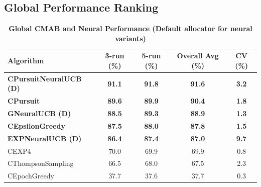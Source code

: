 \documentclass[12pt,a4paper]{article}
\newcommand{\performance}[1]{\textcolor{performancecolor}{\textbf{#1}}}
\newcommand{\legacy}[1]{\textcolor{legacycolor}{\textbf{#1}}}
\newcommand{\neural}[1]{\textcolor{neuralcolor}{\textbf{#1}}}
\begin{document}
\begin{tcolorbox}[colback=performancecolor!10,colframe=performancecolor,title=\textbf{Primary Performance Results (All Aggregations)}]

\subsection{Global Performance Ranking}

\begin{table}[H]
\small
\centering
\caption{\performance{Global CMAB and Neural Performance (Default allocator for neural variants)}}
\label{tab:global-performance}
\begin{tabular}{|l|c|c|c|c|}
\hline
\textbf{Algorithm} & \textbf{3-run (\%)} & \textbf{5-run (\%)} & \textbf{Overall Avg (\%)} & \textbf{CV (\%)} \\
\hline
\hline
\neural{CPursuitNeuralUCB (D)}   & \neural{91.1}     & \neural{91.8}     & \neural{\textbf{91.6}} & \neural{3.2} \\
\performance{CPursuit}           & \performance{89.6} & \performance{89.9} & \performance{\textbf{90.4}} & \performance{1.8} \\
\neural{GNeuralUCB (D)}          & \neural{88.5}     & \neural{89.3}     & \neural{\textbf{88.9}} & \neural{1.3} \\
\performance{CEpsilonGreedy}     & \performance{87.5} & \performance{88.0} & \performance{\textbf{87.8}} & \performance{1.5} \\
\legacy{EXPNeuralUCB (D)}        & \legacy{86.4}     & \legacy{87.4}     & \legacy{\textbf{87.0}} & \legacy{9.7} \\
CEXP4                           & 70.0              & 69.9              & 69.9 & 0.8 \\
CThompsonSampling               & 66.5              & 68.0              & 67.5 & 2.3 \\
CEpochGreedy                    & 37.7              & 37.6              & 37.7 & 0.3 \\
\hline
\end{tabular}
\end{table}


\end{tcolorbox}
\end{document}
